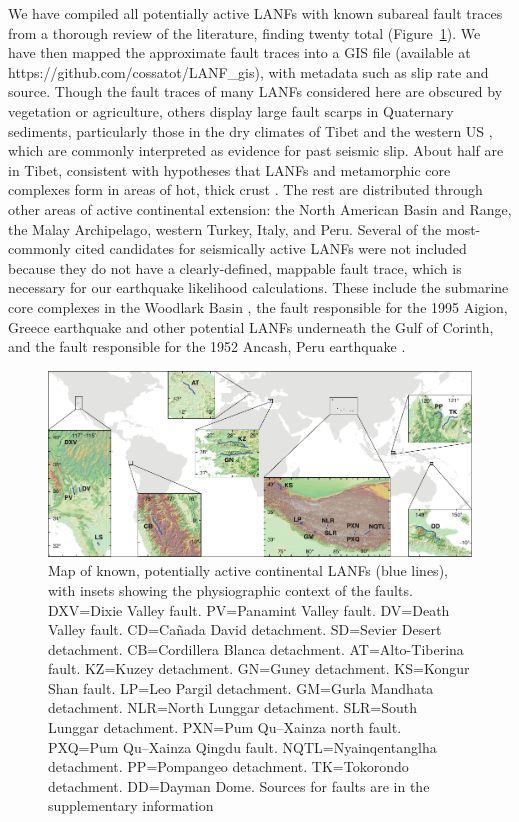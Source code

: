\documentclass[draft,grl]{AGUTeX}
\begin{document}
\begin{article}
We have compiled all potentially active LANFs with known subareal
fault traces from a thorough review of the literature, finding twenty
total (Figure~\ref{fig:lanf_map}).  We have then mapped the approximate fault
traces into a GIS file (available at https://github.com/cossatot/LANF\_gis), 
with metadata such as slip rate and source. Though the fault traces of many
LANFs considered here are obscured by vegetation or agriculture, others
display large fault scarps in Quaternary sediments, particularly those in the
dry climates of Tibet \citep[e.g.,][]{styron2013slr, kapp2005nqtl} and the
western US \citep[e.g.,][]{axen1999baja, hayman2003dv}, which are commonly
interpreted as evidence for past seismic slip.  About half are in Tibet,
consistent with hypotheses that LANFs and metamorphic core complexes
form in areas of hot, thick crust \citep [e.g.,][]{buck1991mcc}.  The
rest are distributed through other areas of active continental
extension: the North American Basin and Range, the Malay Archipelago,
western Turkey, Italy, and Peru. Several of the most-commonly cited
candidates for seismically active LANFs were not included because they
do not have a clearly-defined, mappable fault trace, which is
necessary for our earthquake likelihood calculations.  These include the 
submarine core complexes in the Woodlark Basin \citep{abers2001}, the fault
responsible for the 1995 Aigion, Greece earthquake \citep{bernard1997}
and other potential LANFs underneath the Gulf of Corinth, and the
fault responsible for the 1952 Ancash, Peru earthquake
\citep{doser1987ancash}.


\begin{figure}[th]
\noindent\includegraphics[width=40pc]{./figures/active_lanfs_map_insets.pdf}
\caption{Map of known, potentially active continental LANFs (blue lines), with
insets showing the physiographic context of the faults.  DXV=Dixie Valley
fault.  PV=Panamint Valley fault.  DV=Death Valley fault.  CD=Ca\~nada David
detachment.  SD=Sevier Desert detachment.  CB=Cordillera Blanca detachment.  
AT=Alto-Tiberina fault.  KZ=Kuzey detachment.  GN=Guney detachment.  
KS=Kongur Shan fault.  LP=Leo Pargil detachment.  GM=Gurla Mandhata 
detachment. NLR=North Lunggar detachment.  SLR=South Lunggar detachment.  
PXN=Pum Qu--Xainza north fault.  PXQ=Pum Qu--Xainza Qingdu fault. 
NQTL=Nyainqentanglha detachment.  PP=Pompangeo detachment.  
TK=Tokorondo detachment.  DD=Dayman Dome.  Sources for faults are in the 
supplementary information}
\label{fig:lanf_map}
\end{figure}



\end{article}
\end{document}
